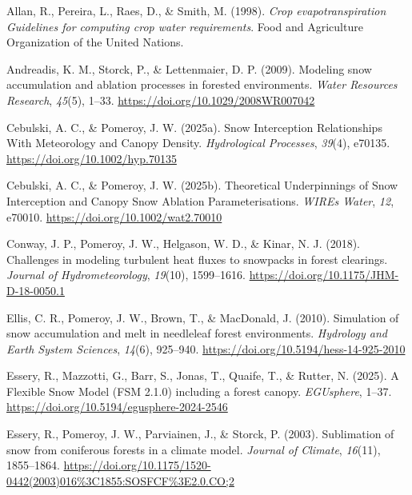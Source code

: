 \documentclass[
  letterpaper,
  DIV=11,
  numbers=noendperiod]{scrartcl}
\newlength{\cslhangindent}
\newenvironment{CSLReferences}[2] %
 {\begin{list}{}{%
  \setlength{\itemindent}{0pt}
  \setlength{\leftmargin}{0pt}
  \setlength{\parsep}{0pt}
  \ifodd #1
   \setlength{\leftmargin}{\cslhangindent}
   \setlength{\itemindent}{-1\cslhangindent}
  \fi
  \setlength{\itemsep}{#2\baselineskip}}}
 {\end{list}}
\begin{document}
\label{refs}
\begin{CSLReferences}{1}{0}
Allan, R., Pereira, L., Raes, D., \& Smith, M. (1998). \emph{Crop
evapotranspiration {Guidelines} for computing crop water requirements}.
{Food and Agriculture Organization of the United Nations}.

Andreadis, K. M., Storck, P., \& Lettenmaier, D. P. (2009). Modeling
snow accumulation and ablation processes in forested environments.
\emph{Water Resources Research}, \emph{45}(5), 1--33.
\url{https://doi.org/10.1029/2008WR007042}

Cebulski, A. C., \& Pomeroy, J. W. (2025a). Snow {Interception
Relationships With Meteorology} and {Canopy Density}. \emph{Hydrological
Processes}, \emph{39}(4), e70135.
\url{https://doi.org/10.1002/hyp.70135}

Cebulski, A. C., \& Pomeroy, J. W. (2025b). Theoretical {Underpinnings}
of {Snow Interception} and {Canopy Snow Ablation Parameterisations}.
\emph{WIREs Water}, \emph{12}, e70010.
\url{https://doi.org/10.1002/wat2.70010}

Conway, J. P., Pomeroy, J. W., Helgason, W. D., \& Kinar, N. J. (2018).
Challenges in modeling turbulent heat fluxes to snowpacks in forest
clearings. \emph{Journal of Hydrometeorology}, \emph{19}(10),
1599--1616. \url{https://doi.org/10.1175/JHM-D-18-0050.1}

Ellis, C. R., Pomeroy, J. W., Brown, T., \& MacDonald, J. (2010).
Simulation of snow accumulation and melt in needleleaf forest
environments. \emph{Hydrology and Earth System Sciences}, \emph{14}(6),
925--940. \url{https://doi.org/10.5194/hess-14-925-2010}

Essery, R., Mazzotti, G., Barr, S., Jonas, T., Quaife, T., \& Rutter, N.
(2025). A {Flexible Snow Model} ({FSM} 2.1.0) including a forest canopy.
\emph{EGUsphere}, 1--37.
\url{https://doi.org/10.5194/egusphere-2024-2546}

Essery, R., Pomeroy, J. W., Parviainen, J., \& Storck, P. (2003).
Sublimation of snow from coniferous forests in a climate model.
\emph{Journal of Climate}, \emph{16}(11), 1855--1864.
\url{https://doi.org/10.1175/1520-0442(2003)016\%3C1855:SOSFCF\%3E2.0.CO;2}


\end{CSLReferences}
\end{document}
